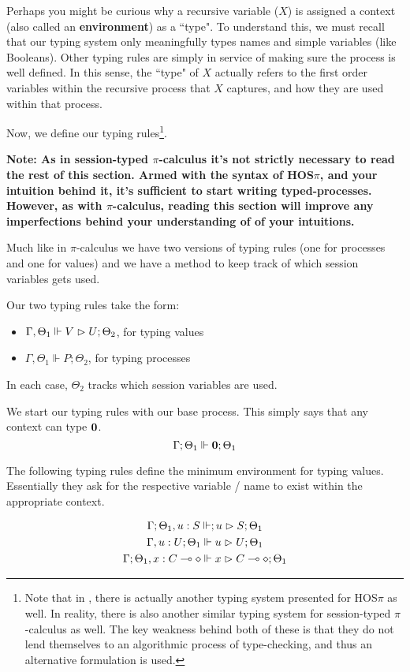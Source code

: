 Perhaps you might be curious why a recursive variable ($X$) is assigned a context (also called an \textbf{environment}) as a ``type". To understand this, we must recall that our typing system only meaningfully types names and simple variables (like Booleans). Other typing rules are simply in service of making sure the process is well defined. In this sense, the ``type" of $X$ actually refers to the first order variables within the recursive process that $X$ captures, and how they are used within that process.

Now, we define our typing rules\footnote{Note that in \cite{main}, there is actually another typing system presented for HOS$\pi$ as well. In reality, there is also another similar typing system for session-typed $\pi$-calculus as well. The key weakness behind both of these is that they do not lend themselves to an algorithmic process of type-checking, and thus an alternative formulation is used.}. 

\textbf{Note: As in session-typed $\pi$-calculus it's not strictly necessary to read the rest of this section. Armed with the syntax of HOS$\pi$, and your intuition behind it, it's sufficient to start writing typed-processes. However, as with $\pi$-calculus, reading this section will improve any imperfections behind your understanding of of your intuitions.}

Much like in $\pi$-calculus we have two versions of typing rules (one for processes and one for values) and we have a method to keep track of which session variables gets used.

Our two typing rules take the form:
\begin{itemize}
\item $\Gamma, \Theta_1 \Vdash V \vartriangleright U ; \Theta_2$, for typing values
\item $\Gamma, \Theta_1 \Vdash P ; \Theta_2$, for typing processes
\end{itemize}

In each case, $\Theta_2$ tracks which session variables are used.


We start our typing rules with our base process. This simply says that any context can type $\textbf{0}$.
$$
\Gamma ; \Theta_1 \Vdash \textbf{0} ; \Theta_1
$$

The following typing rules define the minimum environment for typing values. Essentially they ask for the respective variable / name to exist within the appropriate context.

\begin{gather*}
\Gamma ; \Theta_1, u:S \Vdash ; u \vartriangleright S ; \Theta_1 \\
\Gamma, u : U ; \Theta_1 \Vdash u \vartriangleright U ; \Theta_1 \\
\Gamma ; \Theta_1 , x : C \multimap \diamond \Vdash x \vartriangleright C \multimap \diamond ; \Theta_1
\end{gather*}

